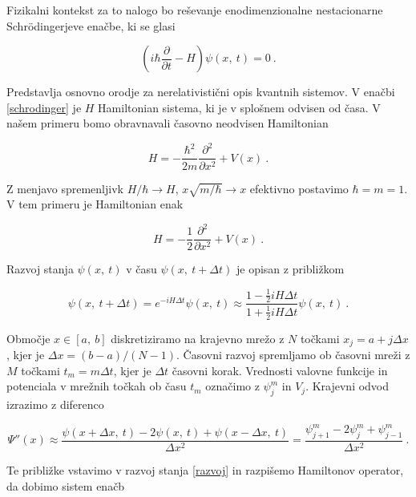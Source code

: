 \documentclass[a4paper]{article}
\begin{document}
Fizikalni kontekst za to nalogo bo reševanje enodimenzionalne nestacionarne Schrödingerjeve enačbe, ki se
glasi

\begin{equation}
    \left( i\hbar \frac{\partial}{\partial t} - H\right) \psi(x,\>t) = 0\>.
    \label{schrodinger}
\end{equation}

Predstavlja osnovno orodje za nerelativistični opis kvantnih sistemov. V enačbi \ref{schrodinger} je $H$ Hamiltonian
sistema, ki je v splošnem odvisen od časa. V našem primeru bomo obravnavali časovno neodvisen Hamiltonian

\begin{equation}
    H = -\frac{\hbar^2}{2m} \frac{\partial^2}{\partial x^2} + V(x)\>.
    \label{hamiltonian}
\end{equation}

Z menjavo spremenljivk $H/\hbar \rightarrow H$, $x\sqrt{m/\hbar} \rightarrow x$ efektivno postavimo $\hbar = m = 1$.
V tem primeru je Hamiltonian enak

\begin{equation}
    H = -\frac{1}{2} \frac{\partial^2}{\partial x^2} + V(x)\>.
    \label{hamiltonian2}
\end{equation}

Razvoj stanja $\psi(x,\>t)$ v času $\psi(x,\>t + \Delta t)$ je opisan z približkom

\begin{equation}
    \psi(x,\>t + \Delta t) = e^{-iH\Delta t}\psi(x,\>t)\approx \dfrac{1-\frac{1}{2}iH\Delta t}
    {1+\frac{1}{2}iH\Delta t}\psi(x,\>t)\>.
    \label{razvoj}
\end{equation}

Območje $x\in[a,\>b]$ diskretiziramo na krajevno mrežo z $N$ točkami $x_j = a + j\Delta x$, kjer je $\Delta x = (b-a)/(N-1)$.
Časovni razvoj spremljamo ob časovni mreži z $M$ točkami $t_m = m\Delta t$, kjer je $\Delta t$ časovni korak. Vrednosti valovne
funkcije in potenciala v mrežnih točkah ob času $t_m$ označimo z $\psi_j^m$ in $V_j$. Krajevni odvod izrazimo z 
diferenco

\begin{equation}
    \Psi''(x) \approx \frac{\psi(x + \Delta x,\>t)-2\psi(x,\>t)+\psi(x-\Delta x,\>t)}{\Delta x^2} 
    = \frac{\psi_{j+1}^m - 2\psi_j^m + \psi_{j-1}^m}{\Delta x^2}\>.
    \label{krajevni_odvod}
\end{equation}

Te približke vstavimo v razvoj stanja \ref{razvoj} in razpišemo Hamiltonov operator, da dobimo sistem enačb
\end{document}
